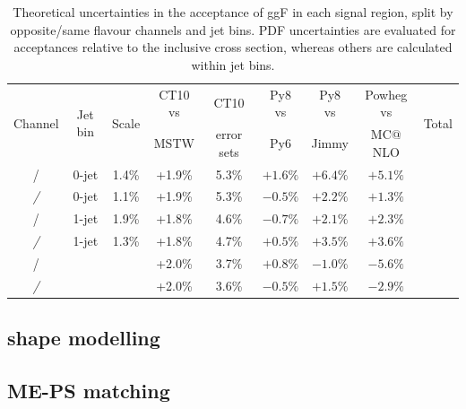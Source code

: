 \begin{table}
	\begin{tabular}{cc|ccccccc}
		\multirow{2}{*}{Channel} & \multirow{2}{*}{Jet bin} & \multirow{2}{*}{Scale} & CT10 vs & CT10 & Py8 vs & Py8 vs & Powheg vs & \multirow{2}{*}{Total} \\
		&  &  & MSTW & error sets & Py6 & Jimmy & MC$@$NLO \\
		\hline
		\ee/\mm &   0-jet & 1.4\% & +1.9\% & 5.3\% & $+1.6\%$ & $+6.4\%$ & $+5.1\%$ \\
		\em/\me &   0-jet & 1.1\% & +1.9\% & 5.3\% & $-0.5\%$ & $+2.2\%$ & $+1.3\%$ \\
		\ee/\mm &   1-jet & 1.9\% & +1.8\% & 4.6\% & $-0.7\%$ & $+2.1\%$ & $+2.3\%$ \\
		\em/\me &   1-jet & 1.3\% & +1.8\% & 4.7\% & $+0.5\%$ & $+3.5\%$ & $+3.6\%$ \\
		\ee/\mm & \twojet &       & +2.0\% & 3.7\% & $+0.8\%$ & $-1.0\%$ & $-5.6\%$ \\
		\em/\me & \twojet &       & +2.0\% & 3.6\% & $-0.5\%$ & $+1.5\%$ & $-2.9\%$ \\
	\end{tabular}
	\caption{Theoretical uncertainties in the acceptance of ggF in each signal 
	region, split by opposite/same flavour channels and jet bins. PDF uncertainties are
	evaluated for acceptances relative to the inclusive cross section, whereas others are
	calculated within jet bins.}
	\label{tab:signal:acc_unc_small}
\end{table}


\subsection{\mt shape modelling}



\subsection{ME-PS matching}

